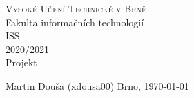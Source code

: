\documentclass{article}
\begin{document}
\clearpage
\begin{titlepage}
	\begin{center}
		\textsc{\LARGE Vysoké Učení Technické v Brně}\\[0.5cm]
		{\LARGE Fakulta informačních technologií }\\[4.0cm]

		\textsc{\LARGE ISS}\\[0.5cm]
		\textsc{\LARGE 2020/2021}\\[3.5cm]

		{\LARGE Projekt}\\[1.0cm]
	\end{center}

	\vfill 

	\begin{flushleft} 
		\large
		Martin Douša (xdousa00)
		\hfill
		Brno, \today
	\end{flushleft}
\end{titlepage}
\thispagestyle{empty}

\newpage
\tableofcontents

\newpage
\listoffigures

\newpage












\end{document}
